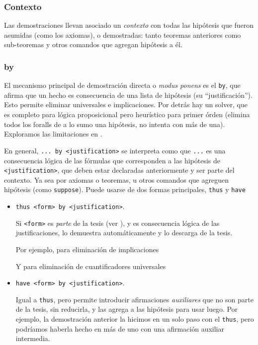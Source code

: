 \subsubsection{Contexto}

Las demostraciones llevan asociado un \textit{contexto} con todas las hipótesis
que fueron asumidas (como los axiomas), o demostradas: tanto teoremas anteriores
como sub-teoremas y otros comandos que agregan hipótesis a él.

\subsubsection{by}

El mecanismo principal de demostración directa o \textit{modus ponens} es el
\lstinline{by}, que afirma que un hecho es consecuencia de una lista de
hipótesis (su ``justificación''). Esto permite eliminar universales e implicaciones. Por detrás hay un
solver, que es completo para lógica proposicional pero heurístico para primer
órden (elimina todos los foralls de a lo sumo una hipótesis, no intenta con más
de una). Exploramos las limitaciones en .

En general, \texttt{... by <justification>} se interpreta como que \texttt{...}
es una consecuencia lógica de las fórmulas que corresponden a las hipótesis de
\texttt{<justification>}, que deben estar declaradas anteriormente y ser parte
del contexto. Ya sea por axiomas o teoremas, u otros comandos que agreguen
hipótesis (como \lstinline{suppose}). Puede usarse de dos formas principales,
\lstinline{thus} y \lstinline{have}

\begin{itemize}
    \item \texttt{thus <form>\ by <justification>}.
    
    Si \texttt{<form>} es \textit{parte} de la tesis (ver
    ), y es consecuencia lógica de las
    justificaciones, lo demuestra automáticamente y lo descarga de la tesis.

    Por ejemplo, para eliminación de implicaciones

    

    Y para eliminación de cuantificadores universales

    

    \item \texttt{have <form>\ by <justification>}.
    
    Igual a \lstinline{thus}, pero permite introducir afirmaciones
    \textit{auxiliares} que no son parte de la tesis, sin reducirla, y las
    agrega a las hipótesis para usar luego. Por ejemplo, la demostración
    anterior la hicimos en un solo paso con el \lstinline{thus}, pero podríamos
    haberla hecho en más de uno con una afirmación auxiliar intermedia.

    
\end{itemize}

